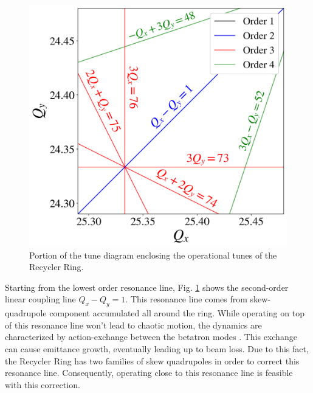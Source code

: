 \begin{figure}[H]
   \centering
   \includegraphics[width=\columnwidth]{chapter3/rrtd.png}
   \caption{Portion of the tune diagram enclosing the operational tunes of the Recycler Ring.}
   \label{fig:rrtd}
\end{figure}

Starting from the lowest order resonance line, Fig. \ref{fig:rrtd} shows the second-order linear coupling line $Q_x-Q_y = 1$. This resonance line comes from skew-quadrupole component accumulated all around the ring. While operating on top of this resonance line won't lead to chaotic motion, the dynamics are characterized by action-exchange between the betatron modes \cite{sylee}. This exchange can cause emittance growth, eventually leading up to beam loss. Due to this fact, the Recycler Ring has two families of skew quadrupoles in order to correct this resonance line. Consequently, operating close to this resonance line is feasible with this correction.

